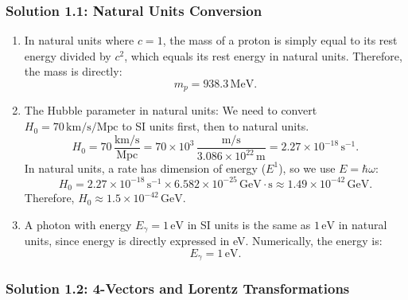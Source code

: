 \subsubsection*{Solution 1.1: Natural Units Conversion}

\begin{enumerate}[label=(\alph*)]
  \item In natural units where $c = 1$, the mass of a proton is simply equal to its rest energy divided by $c^2$, which equals its rest energy in natural units. Therefore, the mass is directly:
  \[
    m_p = 938.3 \, \text{MeV}.
  \]
  
  \item The Hubble parameter in natural units: We need to convert $H_0 = 70 \, \text{km/s/Mpc}$ to SI units first, then to natural units.
  \[
    H_0 = 70 \, \frac{\text{km/s}}{\text{Mpc}} = 70 \times 10^3 \, \frac{\text{m/s}}{3.086 \times 10^{22} \, \text{m}} = 2.27 \times 10^{-18} \, \text{s}^{-1}.
  \]
  In natural units, a rate has dimension of energy ($E^1$), so we use $E = \hbar \omega$:
  \[
    H_0 = 2.27 \times 10^{-18} \, \text{s}^{-1} \times 6.582 \times 10^{-25} \, \text{GeV}\cdot\text{s}
    \approx 1.49 \times 10^{-42} \, \text{GeV}.
  \]
  Therefore, $H_0 \approx 1.5 \times 10^{-42} \, \text{GeV}$.
  
  \item A photon with energy $E_\gamma = 1 \, \text{eV}$ in SI units is the same as $1 \, \text{eV}$ in natural units, since energy is directly expressed in eV. Numerically, the energy is:
  \[
    E_\gamma = 1 \, \text{eV}.
  \]
\end{enumerate}

\subsubsection*{Solution 1.2: 4-Vectors and Lorentz Transformations}

